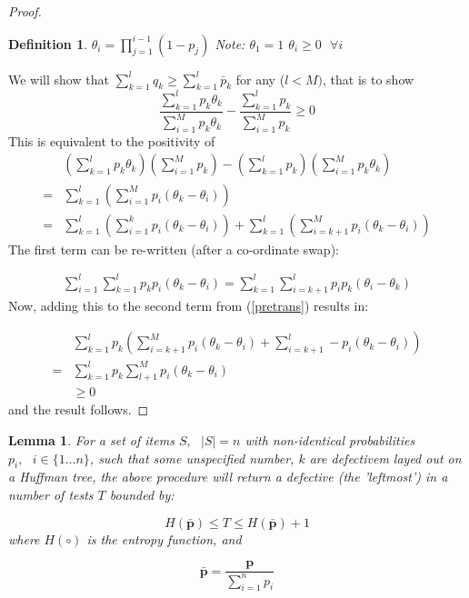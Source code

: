 \documentclass[11pt]{article}
\renewcommand{\vec}[1]{\mathbf{#1}}
\newtheorem{lem}{Lemma}[section]
\newtheorem{definition}{Definition}[section]
\theoremstyle{plain}
\newtheorem{definition}[theorem]{Definition}
\begin{document}
\begin{proof}
\begin{definition}
\(\theta_i = \prod_{j=1}^{i-1}\left(1-p_j\right)\)
Note:
\(\theta_1 = 1\)
\( \theta_i \geq 0 \text{ } \forall i\)
\end{definition}

We will show that \(\sum_{k=1}^l q_k \geq \sum_{k=1}^l \bar{p}_k\) for any (\(l<M)\), that is to show
\begin{equation}
\frac{\sum_{k=1}^l p_k\theta_k}{\sum_{i=1}^M p_k\theta_k} - \frac{\sum_{k=1}^l p_k}{\sum_{i=1}^M p_k} \geq 0
\end{equation}
This is equivalent to the positivity of 
\begin{align}
& \left(\sum_{k=1}^l p_k\theta_k\right)\left(\sum_{i=1}^M p_k\right) - \left(\sum_{k=1}^l p_k\right)\left(\sum_{i=1}^M p_k\theta_k\right) \\
=& \sum_{k=1}^l \left(\sum_{i=1}^M p_i\left(\theta_k - \theta_i\right)\right) \\
=& \sum_{k=1}^l \left(\sum_{i=1}^k p_i\left(\theta_k - \theta_i\right)\right) + \sum_{k=1}^l\left(\sum_{i=k+1}^M p_i\left(\theta_k-\theta_i\right)\right) \label{pretrans}
\end{align}
The first term can be re-written (after a co-ordinate swap):

\begin{align}
\sum_{i=1}^l \sum_{k=1}^l p_k p_i \left(\theta_k - \theta_i\right) = \sum_{k=1}^l \sum_{i=k+1}^l p_i p_k \left(\theta_i - \theta_k\right) 
\end{align}
Now, adding this to the second term from (\ref{pretrans}) results in:

\begin{align}
&\sum_{k=1}^l p_k \left(\sum_{i=k+1}^M p_i\left(\theta_k - \theta_i\right) + \sum_{i=k+1}^l -p_i\left(\theta_k - \theta_i\right)\right) \\
=& \sum_{k=1}^l p_k \sum_{l+1}^M p_i\left(\theta_k - \theta_i\right) \\
&\geq 0
\end{align}
and the result follows.
\end{proof}

\begin{lem}
For a set of items \(S, \text{ } \lvert S \rvert = n\) with non-identical probabilities \(p_i, \text{ } i \in \{1\ldots n\} \), such that some unspecified number, \(k\) are defectivem layed out on a Huffman tree, the above procedure will return a defective (the 'leftmost') in a number of tests \(T\) bounded by:

\begin{equation}
H\left(\vec{\bar{p}}\right) \leq T \leq H\left(\vec{\bar{p}}\right) + 1
\end{equation}
where \( H\left( \circ \right) \) is the entropy function, and

\begin{equation}
\vec{\bar{p}} = \frac{\vec{p}}{\sum_{i=1}^n p_i}
\end{equation}
\end{lem}
\end{document}

